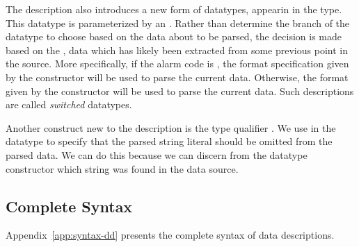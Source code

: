 The \darkstar{} description also introduces a new form of datatypes,
appearin in the  type.  This datatype is parameterized by an
.  Rather than determine the branch of the datatype to
choose based on the data about to be parsed, the decision is made
based on the , data which has likely been extracted
from some previous point in the source.  More specifically, if the
alarm code is , the format specification given by the
 constructor will be used to parse the current data.
Otherwise, the format given by the  constructor will be
used to parse the current data. Such descriptions are called
\textit{switched} datatypes.

Another construct new to the \darkstar{} description is the type qualifier
. We use  in the  datatype to specify
that the parsed string literal should be omitted from the parsed
data. We can do this because we can discern from the datatype constructor
which string was found in the data source.

\subsection{Complete Syntax}

Appendix~\ref{app:syntax-dd} presents the complete syntax of
\padsml{} data descriptions.

